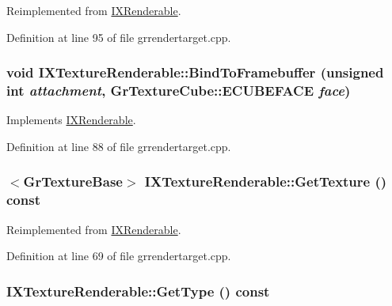 Reimplemented from \hyperlink{class_i_x_renderable_4e47253020e9f0faabb51b37ee5e16ae}{IXRenderable}.

Definition at line 95 of file grrendertarget.cpp.\hypertarget{class_i_x_texture_renderable_79cbe96edff769e27c5dbbcb1defdd2d}{
\subsubsection[{BindToFramebuffer}]{\setlength{\rightskip}{0pt plus 5cm}void IXTextureRenderable::BindToFramebuffer (unsigned int {\em attachment}, \/  {\bf GrTextureCube::ECUBEFACE} {\em face})}}
\label{class_i_x_texture_renderable_79cbe96edff769e27c5dbbcb1defdd2d}




Implements \hyperlink{class_i_x_renderable_c5ea40caedef9885429ab5c7dccb0163}{IXRenderable}.

Definition at line 88 of file grrendertarget.cpp.\hypertarget{class_i_x_texture_renderable_360a1f72f8781be9af2d9616b006ee31}{
\subsubsection[{GetTexture}]{$<${\bf GrTextureBase}$>$ IXTextureRenderable::GetTexture () const}}
\label{class_i_x_texture_renderable_360a1f72f8781be9af2d9616b006ee31}




Reimplemented from \hyperlink{class_i_x_renderable_2a74a8b8f702af0557134858ec263aea}{IXRenderable}.

Definition at line 69 of file grrendertarget.cpp.\hypertarget{class_i_x_texture_renderable_51527120351185e79124254a61616fdb}{
\subsubsection[{GetType}]{ IXTextureRenderable::GetType () const}}
\label{class_i_x_texture_renderable_51527120351185e79124254a61616fdb}




